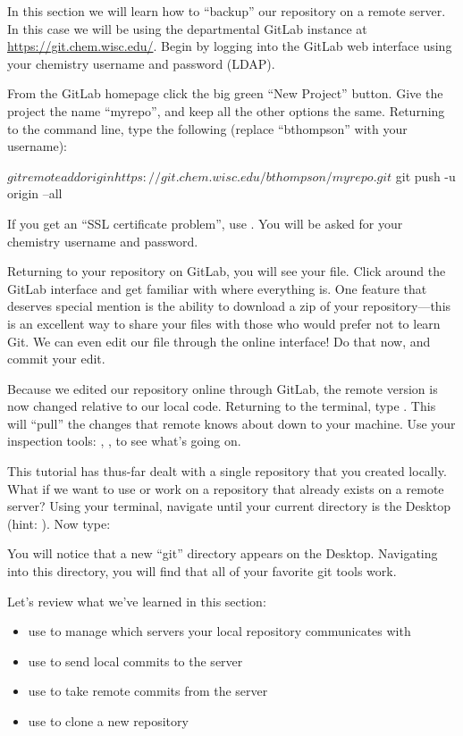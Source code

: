 \documentclass{training}
\begin{document}
In this section we will learn how to ``backup'' our repository on a remote server.
In this case we will be using the departmental GitLab instance at \url{https://git.chem.wisc.edu/}.
Begin by logging into the GitLab web interface using your chemistry username and password (LDAP).

From the GitLab homepage click the big green ``New Project'' button.
Give the project the name ``myrepo'', and keep all the other options the same.
Returning to the command line, type the following (replace ``bthompson'' with your username):
\begin{bash}
$ git remote add origin https://git.chem.wisc.edu/bthompson/myrepo.git
$ git push -u origin --all
\end{bash}
If you get an ``SSL certificate problem'', use .
You will be asked for your chemistry username and password.

Returning to your repository on GitLab, you will see your  file.
Click around the GitLab interface and get familiar with where everything is.
One feature that deserves special mention is the ability to download a zip of your repository---this is an excellent way to share your files with those who would prefer not to learn Git.
We can even edit our  file through the online interface!
Do that now, and commit your edit.

Because we edited our repository online through GitLab, the remote version is now changed relative to our local code.
Returning to the terminal, type .
This will ``pull'' the changes that remote knows about down to your machine.
Use your inspection tools: , ,  to see what's going on.

This tutorial has thus-far dealt with a single repository that you created locally.
What if we want to use or work on a repository that already exists on a remote server?
Using your terminal, navigate until your current directory is the Desktop (hint: ).
Now type:
You will notice that a new ``git'' directory appears on the Desktop.
Navigating into this directory, you will find that all of your favorite git tools work.

Let's review what we've learned in this section:
\begin{itemize}
  \item use  to manage which servers your local repository communicates with
  \item use  to send local commits to the server
  \item use  to take remote commits from the server
  \item use  to clone a new repository
\end{itemize}
\end{document}
